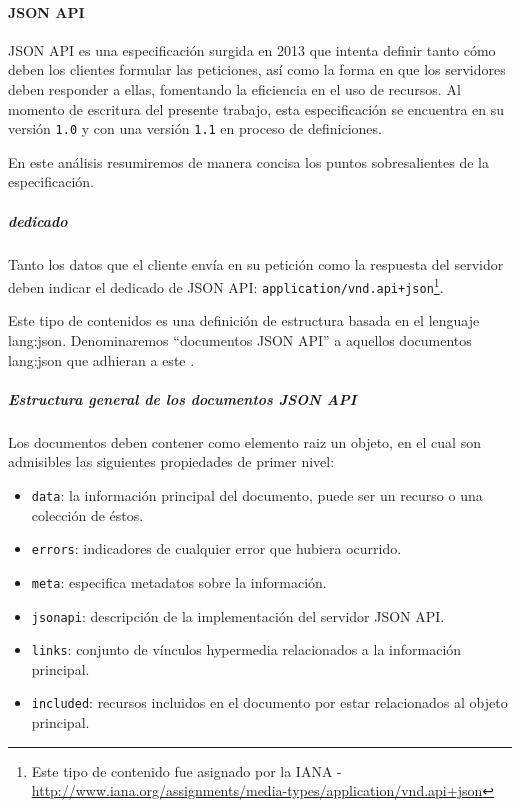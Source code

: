 \paragraph{JSON API}
\label{soa:tecnologias:json-api}

JSON API es una especificación surgida en 2013 que intenta definir tanto cómo deben los clientes formular las peticiones, así como la forma en que los servidores deben responder a ellas, fomentando la eficiencia en el uso de recursos. Al momento de escritura del presente trabajo, esta especificación se encuentra en su versión \texttt{1.0} y con una versión \texttt{1.1} en proceso de definiciones.

En este análisis resumiremos de manera concisa los puntos sobresalientes de la especificación.

\subparagraph{ dedicado}

Tanto los datos que el cliente envía en su petición como la respuesta del servidor deben indicar el  dedicado de JSON API: \texttt{application/vnd.api+json}\footnote{Este tipo de contenido fue asignado por la IANA - \url{http://www.iana.org/assignments/media-types/application/vnd.api+json}}.

Este tipo de contenidos es una definición de estructura basada en el lenguaje \gls{lang:json}. Denominaremos ``documentos JSON API'' a aquellos documentos \gls{lang:json} que adhieran a este .

\subparagraph{Estructura general de los documentos JSON API}

Los documentos deben contener como elemento raiz un objeto, en el cual son admisibles las siguientes propiedades de primer nivel:

\begin{itemize}
  \item \texttt{data}: la información principal del documento, puede ser un recurso o una colección de éstos.
  \item \texttt{errors}: indicadores de cualquier error que hubiera ocurrido.
  \item \texttt{meta}: especifica metadatos sobre la información.
  \item \texttt{jsonapi}: descripción de la implementación del servidor JSON API.
  \item \texttt{links}: conjunto de vínculos hypermedia relacionados a la información principal.
  \item \texttt{included}: recursos incluidos en el documento por estar relacionados al objeto principal.
\end{itemize}

